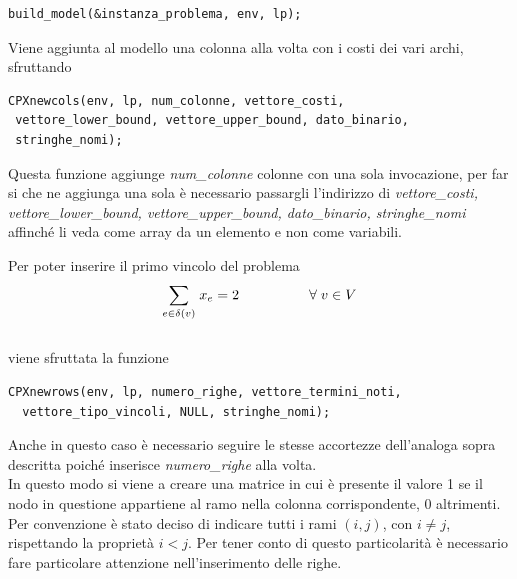 \begin{lstlisting}[basicstyle=\footnotesize\sffamily,]     
build_model(&instanza_problema, env, lp);
\end{lstlisting}

Viene aggiunta al modello una colonna alla volta con i costi dei vari archi, sfruttando \\

\begin{lstlisting}[basicstyle=\footnotesize\sffamily,]     
CPXnewcols(env, lp, num_colonne, vettore_costi,
 vettore_lower_bound, vettore_upper_bound, dato_binario, 
 stringhe_nomi);
\end{lstlisting}

Questa funzione aggiunge \textit{num\_colonne} colonne con una sola invocazione, per far si che ne aggiunga una sola è necessario passargli l'indirizzo di \textit{vettore\_costi, vettore\_lower\_bound, vettore\_upper\_bound, dato\_binario, stringhe\_nomi} affinché li veda come array da un elemento e non come variabili.

Per poter inserire il primo vincolo del problema\\

$$
\underset{e\in \delta(v)}\sum{\;x_e} = 2\;\;\;\;\;\;\;\;\;\;\;\;\;\;\;\;\;\;\forall\;v\in V \\\\
$$
\\
viene sfruttata la funzione \\

\begin{lstlisting}[basicstyle=\footnotesize\sffamily,]     
 CPXnewrows(env, lp, numero_righe, vettore_termini_noti,
  vettore_tipo_vincoli, NULL, stringhe_nomi);
\end{lstlisting}

Anche in questo caso è necessario seguire le stesse accortezze dell'analoga sopra descritta poiché inserisce \textit{numero\_righe} alla volta.\\
In questo modo si viene a creare una matrice in cui è presente il valore 1 se il nodo in questione appartiene al ramo nella colonna corrispondente, 0 altrimenti.\\
Per convenzione è stato deciso di indicare tutti i rami $(i,j)$, con $i\neq j$, rispettando la proprietà $i<j$. Per tener conto di questo particolarità è necessario fare particolare attenzione nell'inserimento delle righe.\\

